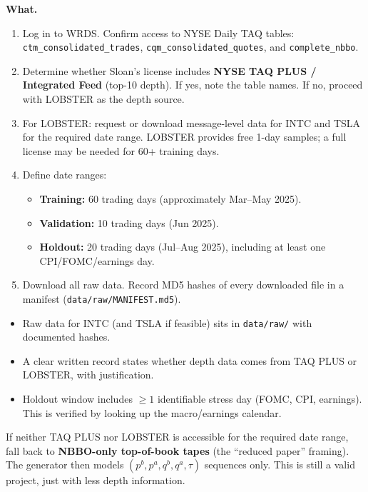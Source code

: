 \documentclass[11pt,a4paper]{article}
\begin{document}
\textbf{What.}
\begin{enumerate}[nosep]
  \item Log in to WRDS.  Confirm access to NYSE Daily TAQ tables: \texttt{ctm\_consolidated\_trades}, \texttt{cqm\_consolidated\_quotes}, and \texttt{complete\_nbbo}.
  \item Determine whether Sloan's license includes \textbf{NYSE TAQ PLUS / Integrated Feed} (top-10 depth).  If yes, note the table names.  If no, proceed with LOBSTER as the depth source.
  \item For LOBSTER: request or download message-level data for INTC and TSLA for the required date range.  LOBSTER provides free 1-day samples; a full license may be needed for 60+ training days.
  \item Define date ranges:
    \begin{itemize}[nosep]
      \item \textbf{Training:} 60 trading days (approximately Mar--May 2025).
      \item \textbf{Validation:} 10 trading days (Jun 2025).
      \item \textbf{Holdout:} 20 trading days (Jul--Aug 2025), including at least one CPI/FOMC/earnings day.
    \end{itemize}
  \item Download all raw data.  Record MD5 hashes of every downloaded file in a manifest (\texttt{data/raw/MANIFEST.md5}).
\end{enumerate}

\begin{successbox}
  \begin{itemize}[nosep]
    \item Raw data for INTC (and TSLA if feasible) sits in \texttt{data/raw/} with documented hashes.
    \item A clear written record states whether depth data comes from TAQ PLUS or LOBSTER, with justification.
    \item Holdout window includes $\geq 1$ identifiable stress day (FOMC, CPI, earnings).  This is verified by looking up the macro/earnings calendar.
  \end{itemize}
\end{successbox}

\begin{warnbox}
  If neither TAQ PLUS nor LOBSTER is accessible for the required date range, fall back to \textbf{NBBO-only top-of-book tapes} (the ``reduced paper'' framing).  The generator then models $(p^b, p^a, q^b, q^a, \tau)$ sequences only.  This is still a valid project, just with less depth information.
\end{warnbox}
\end{document}

